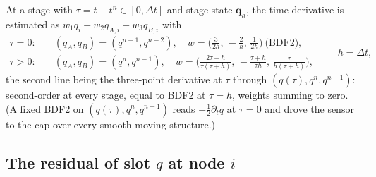 \documentclass[11pt]{article}
\newcommand{\bq}{\mathbf{q}}
\begin{document}
At a stage with $\tau = t - t^n \in [0,\Delta t]$ and stage state $\bq_h$, the
time derivative is estimated as $w_1 q_i + w_2 q_{A,i} + w_3 q_{B,i}$ with
\begin{equation}
\begin{aligned}
\tau = 0:&\quad (q_A, q_B) = (q^{n-1}, q^{n-2}),\quad
w = \Big(\frac{3}{2h},\,-\frac{2}{h},\,\frac{1}{2h}\Big)\ \text{(BDF2)},\\
\tau > 0:&\quad (q_A, q_B) = (q^{n}, q^{n-1}),\quad
w = \Big(\frac{2\tau+h}{\tau(\tau+h)},\,-\frac{\tau+h}{\tau h},\,\frac{\tau}{h(\tau+h)}\Big),
\end{aligned}
\qquad h = \Delta t,
\label{eq:stencil}
\end{equation}
the second line being the three-point derivative at $\tau$ through
$(q(\tau), q^n, q^{n-1})$: second-order at every stage, equal to BDF2 at
$\tau = h$, weights summing to zero. (A fixed BDF2 on $(q(\tau), q^n, q^{n-1})$
reads $-\tfrac12\partial_t q$ at $\tau=0$ and drove the sensor to the cap
over every smooth moving structure.)

\subsection{The residual of slot $q$ at node $i$}
\end{document}
